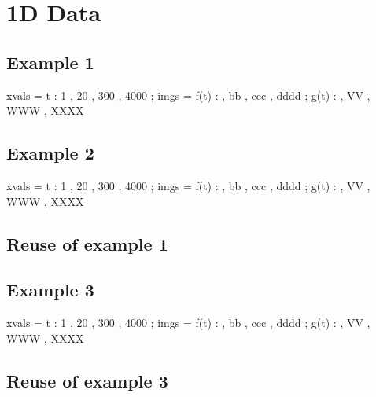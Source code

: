 \documentclass[12pt]{article}
\begin{document}


\section{1D Data}

\subsection{Example 1}

\begin{functable}
    xvals =    t : 1 , 20 , 300 , 4000 ;
    imgs  = f(t) :  , bb , ccc , dddd ;
            g(t) :  , VV , WWW , XXXX
\end{functable}


\subsection{Example 2}

\begin{functable}
    xvals =    t : 1 , 20 , 300 , 4000 ;
    imgs  = f(t) :  , bb , ccc , dddd ;
            g(t) :  , VV , WWW , XXXX
\end{functable}


\subsection{Reuse of example 1}

\begin{functable}[1]
\end{functable}


\subsection{Example 3}

\begin{functable}
    xvals =    t : 1 , 20 , 300 , 4000 ;
    imgs  = f(t) :  , bb , ccc , dddd ;
            g(t) :  , VV , WWW , XXXX
\end{functable}


\subsection{Reuse of example 3}

\begin{functable}[3]
\end{functable}


\end{document}
